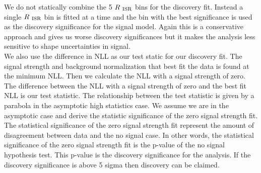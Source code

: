 \indent We do not statically combine the 5 $R_{~\mathrm{ISR}}$ bins for the discovery fit.  Instead a single $R_{~\mathrm{ISR}}$ bin is fitted at a time and the bin with the best significance is used as the discovery significance for the signal model.  Again this is a conservative approach and gives us worse discovery significances but it makes the analysis less sensitive to shape uncertainties in signal.  \\

\indent We also use the difference in NLL as our test static for our discovery fit.  The signal strength and background normalization that best fit the data is found at the minimum NLL.  Then we calculate the NLL with a signal strength of zero.  The difference between the NLL with a signal strength of zero and the best fit NLL is our test statistic.  The relationship between the test statistic is given by a parabola in the asymptotic high statistics case. We assume we are in the asymptotic case and derive the statistic significance of the zero signal strength fit.  \\

\indent The statistical significance of the zero signal strength fit represent the amount of disagreement between data and the no signal case.  In other words, the statistical significance of the zero signal strength fit is the p-value of the no signal hypothesis test.  This p-value is the discovery significance for the analysis.  If the discovery significance is above 5 sigma then discovery can be claimed.\\

